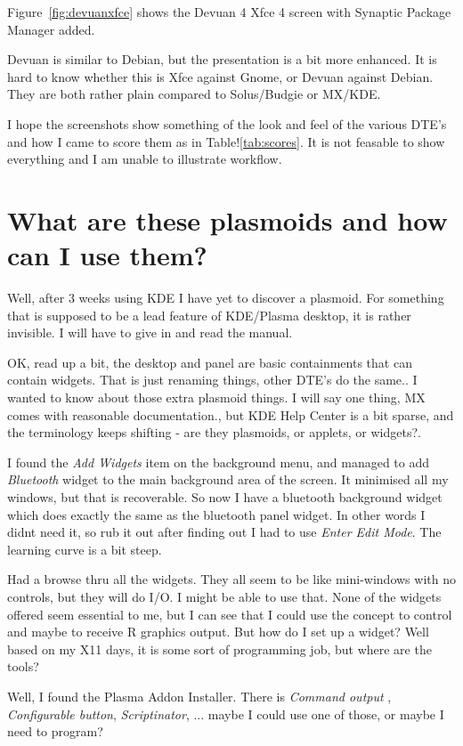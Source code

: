 \documentclass{article}  %
\begin{document}
Figure~\ref{fig:devuanxfce} shows the Devuan 4 Xfce 4  screen with Synaptic Package Manager added. 

Devuan is similar to Debian, but the presentation is a bit more enhanced. It is hard to know whether this is Xfce against Gnome, or Devuan against Debian. They are both rather plain compared to Solus/Budgie or MX/KDE.

I hope the screenshots show something of the look and feel of the various DTE's and how I came to score them as in Table!\ref{tab:scores}. It is not feasable to show everything and I am unable to illustrate workflow.


\clearpage
\section{What are these plasmoids and how can I use them?}
Well, after 3 weeks using KDE I have yet to discover a plasmoid. For something that is supposed to be a lead feature of KDE/Plasma desktop, it is rather invisible.  I will have to give in and read the manual.

OK, read up a bit,  the desktop and panel are basic containments that can contain widgets.  That is just renaming things, other DTE's do the same.. I wanted to know about those extra plasmoid things.  I will say one thing, MX comes with reasonable documentation., but KDE Help Center is a bit sparse, and the terminology keeps shifting - are they plasmoids, or applets, or widgets?.

I found the {\em Add Widgets} item on the background menu, and managed to add  {\em Bluetooth} widget to the main background area of the screen. It minimised all my windows, but that is recoverable. So now I have a bluetooth background widget which does exactly the same as the bluetooth panel widget. In other words I didnt need it, so rub it out after finding out I had to use {\em Enter Edit Mode}.  The learning curve is a bit steep.

 Had a browse thru all the widgets. They all seem to be like mini-windows with no controls, but they will do I/O. I might be able to use that.  None of the widgets offered seem essential to me, but I can see that I could use the concept to control and maybe to receive R graphics output. But how do I set up a widget? Well based on my X11 days, it is some sort of programming job, but where are the tools? 

Well, I found the Plasma Addon Installer. There is {\em Command output} , {\em Configurable button},  {\em Scriptinator},  ...  maybe I could use one of those, or maybe I need to program?
\end{document}
